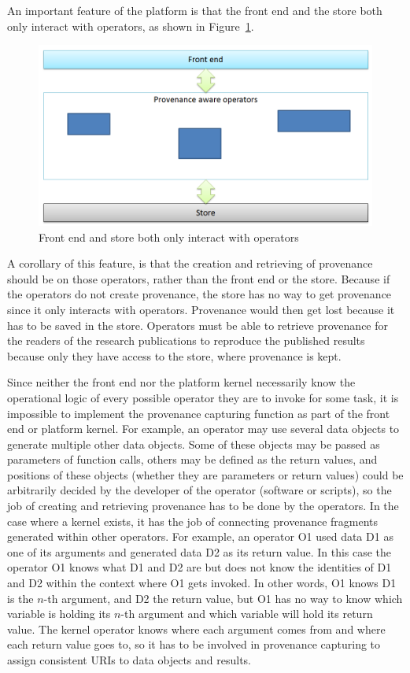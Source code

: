 An important feature of the platform is that the front end and the store both only interact with operators, as shown in Figure~\ref{fig:platform}.
\begin{figure}
	\centering
	\includegraphics[width=\textwidth]{platform.png}
	\caption{Front end and store both only interact with operators}
	\label{fig:platform}
\end{figure}
A corollary of this feature, is that the creation and retrieving of provenance should be on those operators, rather than the front end or the store. Because if the operators do not create provenance, the store has no way to get provenance since it only interacts with operators. Provenance would then get lost because it has to be saved in the store. Operators must be able to retrieve provenance for the readers of the research publications to reproduce the published results because only they have access to the store, where provenance is kept.

Since neither the front end nor the platform kernel necessarily know the operational logic of every possible operator they are to invoke for some task, it is impossible to implement the provenance capturing function as part of the front end or platform kernel. For example, an operator may use several data objects to generate multiple other data objects. Some of these objects may be passed as parameters of function calls, others may be defined as the return values, and positions of these objects (whether they are parameters or return values) could be arbitrarily decided by the developer of the operator (software or scripts), so the job of creating and retrieving provenance has to be done by the operators. In the case where a kernel exists, it has the job of connecting provenance fragments generated within other operators. For example, an operator O1 used data D1 as one of its arguments and generated data D2 as its return value. In this case the operator O1 knows what D1 and D2 are but does not know the identities of D1 and D2 within the context where O1 gets invoked. In other words, O1 knows D1 is the $n$-th argument, and D2 the return value, but O1 has no way to know which variable is holding its $n$-th argument and which variable will hold its return value. The kernel operator knows where each argument comes from and where each return value goes to, so it has to be involved in provenance capturing to assign consistent URIs to data objects and results.

